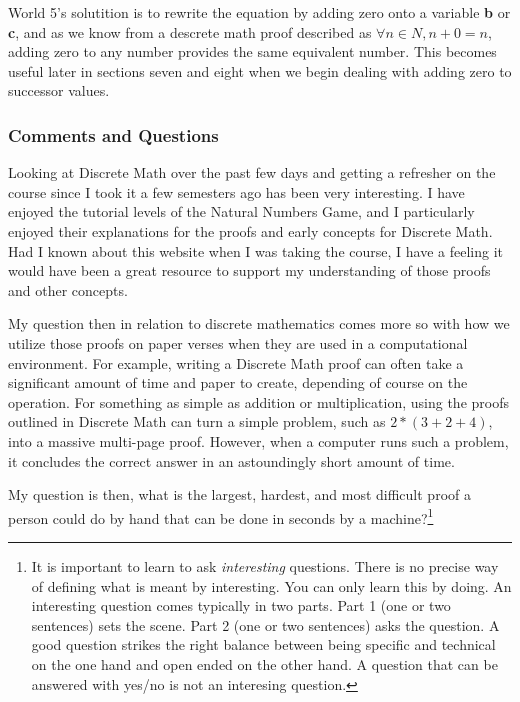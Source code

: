 \documentclass{article}
\theoremstyle{theorem}
\theoremstyle{definition}
\theoremstyle{remark}
\begin{document}
World 5's solutition is to rewrite the equation by adding zero onto a variable \textbf{b} or \textbf{c}, and as we know from a descrete math proof described as $\forall n \in N,n+0=n$, adding zero to any number provides the same equivalent number. This becomes useful later in sections seven and eight when we begin dealing with adding zero to successor values. 

%
%

\subsubsection*{Comments and Questions}

Looking at Discrete Math over the past few days and getting a refresher on the course since I took it a few semesters ago has been very interesting. I have enjoyed the tutorial levels of the Natural Numbers Game, and I particularly enjoyed their explanations for the proofs and early concepts for Discrete Math. Had I known about this website when I was taking the course, I have a feeling it would have been a great resource to support my understanding of those proofs and other concepts. 

My question then in relation to discrete mathematics comes more so with how we utilize those proofs on paper verses when they are used in a computational environment. For example, writing a Discrete Math proof can often take a significant amount of time and paper to create, depending of course on the operation. For something as simple as addition or multiplication, using the proofs outlined in Discrete Math can turn a simple problem, such as $2*(3+2+4)$, into a massive multi-page proof. However, when a computer runs such a problem, it concludes the correct answer in an astoundingly short amount of time.

My question is then, what is the largest, hardest, and most difficult proof a person could do by hand that can be done in seconds by a machine?\footnote{It is important to learn to ask \emph{interesting} questions. There is no precise way of defining what is meant by interesting. You can only learn this by doing. An interesting question comes typically in two parts. Part 1 (one or two sentences) sets the scene. Part 2 (one or two sentences) asks the question. A good question strikes the right balance between being specific and technical on the one hand and open ended on the other hand. A question that can be answered with yes/no is not an interesing question.}
\end{document}
